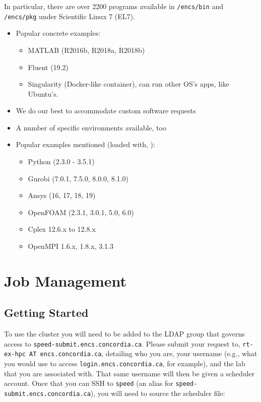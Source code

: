 \documentclass{easychair}
\begin{document}
In particular, there are over 2200 programs available in
\texttt{/encs/bin} and \texttt{/encs/pkg} under Scientific Linux 7 (EL7).

\begin{itemize}
	\item 
Popular concrete examples:
\begin{itemize}
	\item 
MATLAB (R2016b, R2018a, R2018b)
	\item 
Fluent (19.2)
	\item 
Singularity (Docker-like container), can run other OS's apps, like Ubuntu's.
\end{itemize}
	\item 
We do our best to accommodate custom software requests
	\item 
A number of specific environments available, too
	\item 
Popular examples mentioned (loaded with, ):
\begin{itemize}
	\item 
Python (2.3.0 - 3.5.1)
	\item 
Gurobi (7.0.1, 7.5.0, 8.0.0, 8.1.0)
	\item 
Ansys (16, 17, 18, 19)
	\item 
OpenFOAM (2.3.1, 3.0.1, 5.0, 6.0)
	\item 
Cplex 12.6.x to 12.8.x
	\item 
OpenMPI 1.6.x, 1.8.x, 3.1.3
\end{itemize}
\end{itemize}


\section{Job Management}
\label{sect:job-management}

\subsection{Getting Started}

To use the cluster you will need to be added to the LDAP group that governs access to \texttt{speed-submit.encs.concordia.ca}. Please submit your request to, 
\texttt{rt-ex-hpc AT encs.concordia.ca}, detailing who you are, your username (e.g., what you would use to access \texttt{login.encs.concordia.ca}, for example), and the lab that you are associated with. That same username will then be given a scheduler account. Once that you can SSH to \texttt{speed} (an alias for \texttt{speed-submit.encs.concordia.ca}), you will
need to source the scheduler file:
\end{document}
